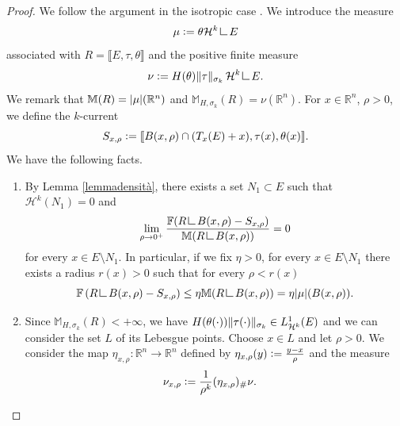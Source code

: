\documentclass{article}
\numberwithin{equation}{section}
\theoremstyle{plain}%
\theoremstyle{definition}
\theoremstyle{definition}
\newcommand{\rgrande}{\mathbb{R}}
\newcommand{\haus}{\mathcal{H}}
\newcommand{\normaflat}{\mathbb{F}}
\newcommand{\massa}{\mathbb{M}}
\newcommand{\massaanisotropa}{\mathbb{M}_{H,\sigma_k}}
\newcommand{\mrestr}{\mathop{\hbox{\vrule height 7pt width 0.5pt depth 0pt
\vrule height 0.5pt width 6pt depth 0pt}}\nolimits}
\DeclarePairedDelimiter{\norma}{\lVert}{\rVert} %
\DeclarePairedDelimiter{\valass}{\lvert}{\rvert} %
\begin{document}
\begin{proof}
    We follow the argument in the isotropic case \cite[Prop. 2.7]{cdrms17}. We introduce the measure
    \begin{equation}\label{eqdefinizionemu}
    \mu \vcentcolon = \theta \haus^k \mrestr E
    \end{equation}
    associated with $R = \llbracket E, \tau, \theta \rrbracket$ and the positive finite measure
    $$
    \nu \vcentcolon= H(\theta) \norma{\tau}_{\sigma_k} \, \haus^k \mrestr E \text{.}
    $$
    We remark that
    $
    \massa (R) = \valass{\mu} (\rgrande^n)$ and $\massaanisotropa (R) = \nu (\rgrande^n)
    $.
    For $x \in \rgrande^n$, $\rho >0$, we define the $k$-current
    $$
    S_{x,\rho} \vcentcolon = \llbracket B(x, \rho) \cap (T_{x} (E) + x) , \tau(x) , \theta (x) \rrbracket
    \text{.}
    $$
    We have the following facts.
    \begin{enumerate}
        \item\label{enum1} By Lemma \ref{lemmadensità}, there exists a set $N_1 \subset E$ such that $\haus^k(N_1) = 0 $ and
        \begin{equation}\label{eq4}
        \lim_{\rho \to 0^+} \frac{\normaflat(R \mrestr B(x,\rho) - S_{x,\rho})}{\massa(R \mrestr B(x,\rho))} = 0
        \end{equation}
        for every $x \in E \setminus N_1$.
        In particular, if we fix $\eta >0$, for every $x \in E \setminus N_1$ there exists a radius $r (x) >0$ such that for every $\rho < r (x)$
        \begin{equation}\label{eqstimanormaflatgenerica}
        \normaflat \left( R \mrestr B(x, \rho) - S_{x, \rho} \right) \leq \eta \massa (R \mrestr B(x,\rho)) = \eta \valass{\mu} (B(x, \rho))
        \text{.}
        \end{equation}
        \item\label{enum2} Since $\massaanisotropa (R) < + \infty$, we have $H(\theta(\cdot))\norma{\tau(\cdot)}_{\sigma_k} \in L^1_{\haus^k}(E)$ and we can consider the set $L$ of its Lebesgue points. Choose $x \in L$ and let $\rho > 0$. We consider the map $\eta_{x,\rho} : \rgrande^n \to \rgrande^n$ defined by $\eta_{x,\rho} (y) \vcentcolon = \frac{y - x}{\rho}$ and the measure
        \begin{equation*}
        \begin{split}
        \nu_{x,\rho} &
        \vcentcolon=
        \frac{1}{\rho^k} (\eta_{x,\rho})_{\#} \nu
        \text{.}
        \end{split}

\end{equation*}
\end{enumerate}
\end{proof}
\end{document}
